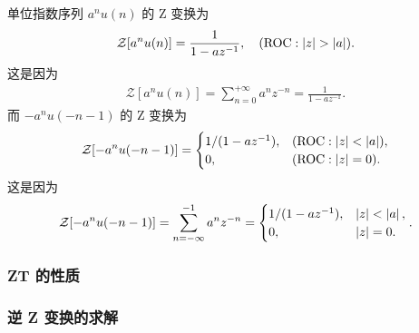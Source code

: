 \begin{example}[单位指数序列的 ZT]
    单位指数序列 $a^n u(n)$ 的 Z 变换为
    \begin{align*}
        \mathcal{Z}[a^n u(n)] = \frac{1}{1 - az^{-1}}, \quad (\text{ROC}: \left|z\right| > \left|a\right|).
    \end{align*}
    这是因为
    \begin{align*}
        \mathcal{Z}[a^n u(n)] = \sum_{n=0}^{+\infty} a^n z^{-n} = \frac{1}{1 - az^{-1}}.
    \end{align*}
    而 $-a^n u(-n-1)$ 的 Z 变换为
    \begin{align*}
        \mathcal{Z}[-a^n u(-n-1)] = \begin{cases}
            1/(1 - az^{-1}), & (\text{ROC}: \left|z\right| < \left|a\right|), \\
            0, & (\text{ROC}: \left|z\right| = 0).
        \end{cases}
    \end{align*}
    这是因为
    \begin{align*}
        \mathcal{Z}[-a^n u(-n-1)] = \sum_{n=-\infty}^{-1} a^n z^{-n}
        = \begin{cases}
            1/(1 - az^{-1}), & \left|z\right| < \left|a\right|, \\
            0, & \left|z\right| = 0.
        \end{cases}.
    \end{align*}
\end{example}

\subsubsection{ZT 的性质}



\subsubsection{逆 Z 变换的求解}
